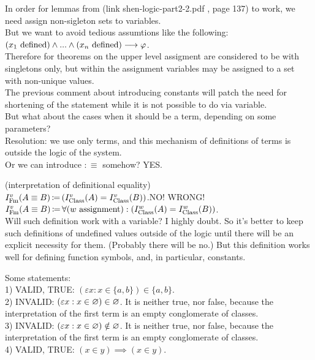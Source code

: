 In order for lemmas from (link shen-logic-part2-2.pdf , page 137) to work, we need assign non-sigleton sets to variables.\\
But we want to avoid tedious assumtions like the following:
$(x_1\mathrm{\ defined})\land...\land(x_n\mathrm{\ defined})\longrightarrow \varphi$.\\
Therefore for theorems on the upper level assigment are considered to be with singletons only, but within the assignment variables may be assigned to a set with non-unique values.\\
The previous comment about introducing constants will patch the need for shortening of the statement while it is not possible to do via variable.\\
But what about the cases when it should be a term, depending on some parameters?\\
Resolution: we use only terms, and this mechanism of definitions of terms is outside the logic of the system.\\
Or we can introduce $:\equiv$ somehow? YES.\\%

\begin{definition}(interpretation of definitional equality)\\
\st{$I^v_{\mathrm{Fm}}(A\equiv B)\,{\coloneqq}\, (I^v_{\text{Class}}(A) = I^v_{\text{Class}}(B))$}.NO! WRONG!\\
$I^v_\Fm(A\equiv B)\ceq \forall(w\ \mbox{assignment}):(I^w_\Class(A) = I^w_\Class(B))$.\\
Will such definition work with a variable? I highly doubt. 
So it's better to keep such definitions of undefined values outside of the logic until there will be an explicit necessity for them. (Probably there will be no.)
But this definition works well for defining function symbols, and, in particular, constants.
\end{definition}

Some statements:\\
1) VALID, TRUE: $(\varepsilon x: x \in \{a,b\})\in \{a,b\}$.\\
2) INVALID: $(\varepsilon x: x \in \varnothing) \in \varnothing$. It is neither true, nor false, because the interpretation of the first term is an empty conglomerate of classes.\\
3) INVALID: $(\varepsilon x: x \in \varnothing) \notin \varnothing$. It is neither true, nor false, because the interpretation of the first term is an empty conglomerate of classes.\\
4) VALID, TRUE: $(x\in y) \implies (x\in y)$.
\fi



